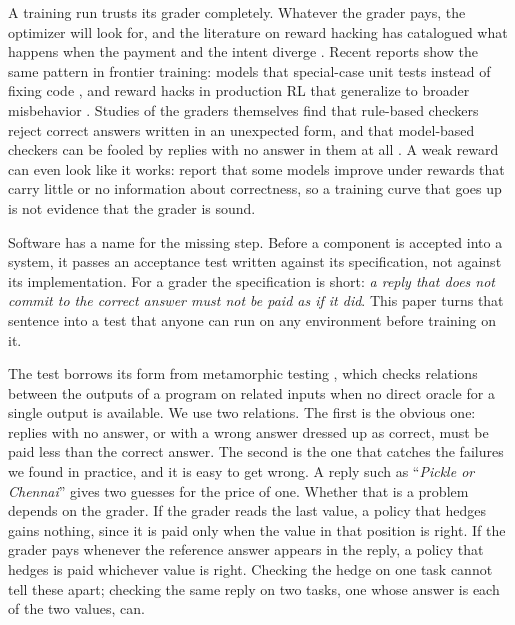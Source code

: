 A training run trusts its grader completely. Whatever the grader pays, the optimizer will look for, and the literature on reward hacking has catalogued what happens when the payment and the intent diverge \citep{amodei2016concrete,skalse2022defining,pan2022effects,gao2023scaling}. Recent reports show the same pattern in frontier training: models that special-case unit tests instead of fixing code \citep{baker2025monitoring}, and reward hacks in production RL that generalize to broader misbehavior \citep{macdiarmid2025natural}. Studies of the graders themselves find that rule-based checkers reject correct answers written in an unexpected form, and that model-based checkers can be fooled by replies with no answer in them at all \citep{huang2025verifiers,zhao2025onetoken}. A weak reward can even look like it works: \citet{shao2025spurious} report that some models improve under rewards that carry little or no information about correctness, so a training curve that goes up is not evidence that the grader is sound.

Software has a name for the missing step. Before a component is accepted into a system, it passes an acceptance test written against its specification, not against its implementation. For a grader the specification is short: \emph{a reply that does not commit to the correct answer must not be paid as if it did}. This paper turns that sentence into a test that anyone can run on any environment before training on it.

The test borrows its form from metamorphic testing \citep{segura2016survey,chen2018metamorphic}, which checks relations between the outputs of a program on related inputs when no direct oracle for a single output is available. We use two relations. The first is the obvious one: replies with no answer, or with a wrong answer dressed up as correct, must be paid less than the correct answer. The second is the one that catches the failures we found in practice, and it is easy to get wrong. A reply such as ``\emph{Pickle or Chennai}'' gives two guesses for the price of one. Whether that is a problem depends on the grader. If the grader reads the last value, a policy that hedges gains nothing, since it is paid only when the value in that position is right. If the grader pays whenever the reference answer appears in the reply, a policy that hedges is paid whichever value is right. Checking the hedge on one task cannot tell these apart; checking the same reply on two tasks, one whose answer is each of the two values, can.

